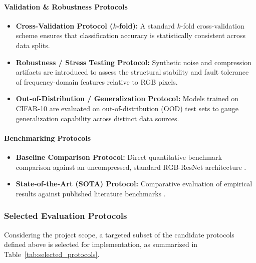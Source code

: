 \documentclass[11pt]{article}
\begin{document}
\paragraph{Validation \& Robustness Protocols}
\begin{itemize}
    \item \textbf{Cross-Validation Protocol ($k$-fold):} A standard $k$-fold cross-validation scheme ensures that classification accuracy is statistically consistent across data splits.

    \item \textbf{Robustness / Stress Testing Protocol:} Synthetic noise and compression artifacts are introduced to assess the structural stability and fault tolerance of frequency-domain features relative to RGB pixels.

    \item \textbf{Out-of-Distribution / Generalization Protocol:} Models trained on CIFAR-10 are evaluated on out-of-distribution (OOD) test sets to gauge generalization capability across distinct data sources.
\end{itemize}

\paragraph{Benchmarking Protocols}
\begin{itemize}
    \item \textbf{Baseline Comparison Protocol:} Direct quantitative benchmark comparison against an uncompressed, standard RGB-ResNet architecture \citep{gueguen2018faster}.

    \item \textbf{State-of-the-Art (SOTA) Protocol:} Comparative evaluation of empirical results against published literature benchmarks \citep{gueguen2018faster}.
\end{itemize}

\subsubsection{Selected Evaluation Protocols}
\label{subsubsec:selected_protocols}

Considering the project scope, a targeted subset of the candidate protocols defined above is selected for implementation, as summarized in Table~\ref{tab:selected_protocols}.
\end{document}

